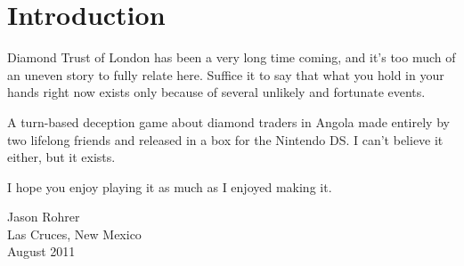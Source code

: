 \documentclass[8pt]{extbook}
\makeatletter
\newcommand{\startopenany}{\@openrightfalse}
\newcommand{\stopopenany}{\@openrighttrue}
\makeatother
\begin{document}
\frontmatter

\tableofcontents


\startopenany
\chapter*{Introduction}

Diamond Trust of London has been a very long time coming, and it's too much of an uneven story to fully relate here.  Suffice it to say that what you hold in your hands right now exists only because of several unlikely and fortunate events.  

A turn-based deception game about diamond traders in Angola made entirely by two lifelong friends and released in a box for the Nintendo DS.  I can't believe it either, but it exists.  

I hope you enjoy playing it as much as I enjoyed making it.

\begin{flushright}
\begin{minipage}{1.5in}
Jason Rohrer\\
Las Cruces, New Mexico\\
August 2011
\end{minipage}
\end{flushright}


\stopopenany

\mainmatter





\makeatletter
\def\myEndPart{\vfil


              \if@twoside
                \null
                \thispagestyle{empty}%
                \newpage
              \fi
              \if@tempswa
                \twocolumn
              \fi}
\makeatother

\makeatletter
\def\standardEndPart{\vfil\newpage
              \if@twoside
                \null
                \thispagestyle{empty}%
                \newpage
              \fi
              \if@tempswa
                \twocolumn
              \fi}
\makeatother




\makeatletter
\renewcommand\@endpart{\myEndPart}
\makeatother

\end{document}
